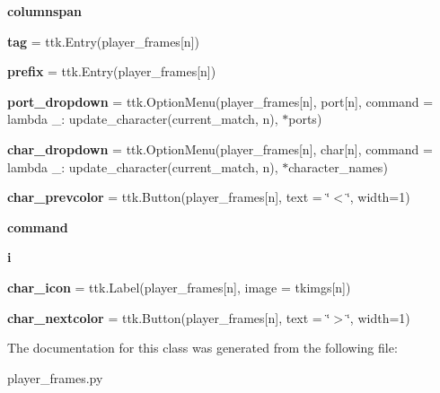 \begin{DoxyCompactItemize}
{\bfseries columnspan}
\item 
\mbox{\label{classssbm-py_1_1player__frames_1_1_player_frames_a55745700c32ebdfa28c2153fbee84576}} 
{\bfseries tag} = ttk.\+Entry(player\+\_\+frames\mbox{[}n\mbox{]})
\item 
\mbox{\label{classssbm-py_1_1player__frames_1_1_player_frames_ae82bee56c117e40554206d46e28e5905}} 
{\bfseries prefix} = ttk.\+Entry(player\+\_\+frames\mbox{[}n\mbox{]})
\item 
\mbox{\label{classssbm-py_1_1player__frames_1_1_player_frames_af0bb7f8c566f5ebf235e27d5444bfd28}} 
{\bfseries port\+\_\+dropdown} = ttk.\+Option\+Menu(player\+\_\+frames\mbox{[}n\mbox{]}, port\mbox{[}n\mbox{]}, command = lambda \+\_\+\+: update\+\_\+character(current\+\_\+match, n), $\ast$ports)
\item 
\mbox{\label{classssbm-py_1_1player__frames_1_1_player_frames_a730c424f3370543df79e54e8355151b5}} 
{\bfseries char\+\_\+dropdown} = ttk.\+Option\+Menu(player\+\_\+frames\mbox{[}n\mbox{]}, char\mbox{[}n\mbox{]}, command = lambda \+\_\+\+: update\+\_\+character(current\+\_\+match, n), $\ast$character\+\_\+names)
\item 
\mbox{\label{classssbm-py_1_1player__frames_1_1_player_frames_a9209cb184ae4224d6e03f0acb9f35261}} 
{\bfseries char\+\_\+prevcolor} = ttk.\+Button(player\+\_\+frames\mbox{[}n\mbox{]}, text = \char`\"{}$<$\char`\"{}, width=1)
\item 
\mbox{\label{classssbm-py_1_1player__frames_1_1_player_frames_a699f4496eb8ad385d0a104f6cd0c1e22}} 
{\bfseries command}
\item 
\mbox{\label{classssbm-py_1_1player__frames_1_1_player_frames_a11ca7c41610b00eed41f755113cd0346}} 
{\bfseries i}
\item 
\mbox{\label{classssbm-py_1_1player__frames_1_1_player_frames_a1cb7ad20a5141b76cc3193a6e39c39e4}} 
{\bfseries char\+\_\+icon} = ttk.\+Label(player\+\_\+frames\mbox{[}n\mbox{]}, image = tkimgs\mbox{[}n\mbox{]})
\item 
\mbox{\label{classssbm-py_1_1player__frames_1_1_player_frames_a3b26f77f00b994f44fa81551f9b215ad}} 
{\bfseries char\+\_\+nextcolor} = ttk.\+Button(player\+\_\+frames\mbox{[}n\mbox{]}, text = \char`\"{}$>$\char`\"{}, width=1)
\end{DoxyCompactItemize}


The documentation for this class was generated from the following file\+:\begin{DoxyCompactItemize}
\item 
player\+\_\+frames.\+py\end{DoxyCompactItemize}
